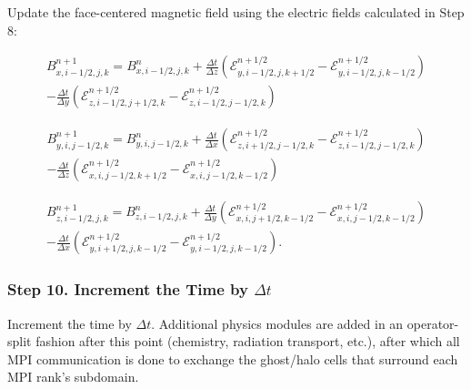 Update the face-centered magnetic field using the electric fields calculated in Step 8:

\begin{equation}
    \begin{aligned}
        B^{n+1}_{x,i-1/2,j,k} = B^{n}_{x,i-1/2,j,k}
        + \frac{\Delta t}{\Delta z} \left( \mathcal{E}^{n+1/2}_{y,i-1/2,j,k+1/2} - \mathcal{E}^{n+1/2}_{y,i-1/2,j,k-1/2} \right) \\
        - \frac{\Delta t}{\Delta y} \left( \mathcal{E}^{n+1/2}_{z,i-1/2,j+1/2,k} - \mathcal{E}^{n+1/2}_{z,i-1/2,j-1/2,k} \right)
    \end{aligned}
\end{equation}

\begin{equation}
    \begin{aligned}
        B^{n+1}_{y,i,j-1/2,k} = B^{n}_{y,i,j-1/2,k}
        + \frac{\Delta t}{\Delta x} \left( \mathcal{E}^{n+1/2}_{z,i+1/2,j-1/2,k} - \mathcal{E}^{n+1/2}_{z,i-1/2,j-1/2,k} \right) \\
        - \frac{\Delta t}{\Delta z} \left( \mathcal{E}^{n+1/2}_{x,i,j-1/2,k+1/2} - \mathcal{E}^{n+1/2}_{x,i,j-1/2,k-1/2} \right)
    \end{aligned}
\end{equation}

\begin{equation}
    \begin{aligned}
        B^{n+1}_{z,i-1/2,j,k} = B^{n}_{z,i-1/2,j,k}
        + \frac{\Delta t}{\Delta y} \left( \mathcal{E}^{n+1/2}_{x,i,j+1/2,k-1/2} - \mathcal{E}^{n+1/2}_{x,i,j-1/2,k-1/2} \right) \\
        - \frac{\Delta t}{\Delta x} \left( \mathcal{E}^{n+1/2}_{y,i+1/2,j,k-1/2} - \mathcal{E}^{n+1/2}_{y,i-1/2,j,k-1/2} \right).
    \end{aligned}
\end{equation}

\subsubsection{Step 10. Increment the Time by \texorpdfstring{$\Delta t$}{dt}}
\label{vlct:increment-time}

Increment the time by $\Delta t$. Additional physics modules are added in an operator-split fashion after this point (chemistry, radiation transport, etc.), after which all MPI communication is done to exchange the ghost/halo cells that surround each MPI rank's subdomain.

